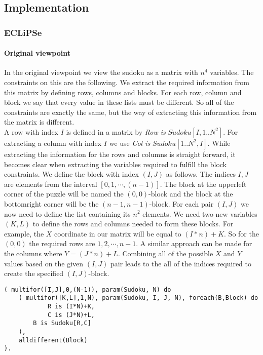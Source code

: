 \subsection{Implementation}
\subsubsection{ECLiPSe}
\paragraph*{Original viewpoint}
In the original viewpoint we view the sudoku as a matrix with $n^{4}$ variables.
The constraints on this are the following.
We extract the required information from this matrix by defining rows, columns and blocks.
For each row, column and block we say that every value in these lists must be different.
So all of the constraints are exactly the same, but the way of extracting this information from the matrix is different.\\

A row with index $I$ is defined in a matrix by \textit{Row is} $Sudoku[I,1..N^{2}]$. 
For extracting a column with index $I$ we use \textit{Col is } $Sudoku[1..N^{2},I]$.
While extracting the information for the rows and columns is straight forward, it becomes clear when extracting the variables required to fulfill the block constraints.
We define the block with index $(I,J)$ as follows. 
The indices $I, J$ are elements from the interval $[0,1,\cdots,(n-1)]$.
The block at the upperleft corner of the puzzle will be named the $(0,0)$-block and the block at the bottomright corner will be the $(n-1,n-1)$-block.
For each pair $(I,J)$ we now need to define the list containing its $n^{2}$ elements.
We need two new variables $(K,L)$ to define the rows and columns needed to form these blocks.
For example, the $X$ coordinate in our matrix will be equal to $(I*n)+K$. 
So for the $(0,0)$ the required rows are $1,2,\cdots,n-1$.
A similar approach can be made for the columns where $Y = (J*n)+L$.
Combining all of the possible $X$ and $Y$ values based on the given $(I,J)$ pair leads to the all of the indices required to create the specified $(I,J)$-block.

\begin{lstlisting}
( multifor([I,J],0,(N-1)), param(Sudoku, N) do
	( multifor([K,L],1,N), param(Sudoku, I, J, N), foreach(B,Block) do
        	R is (I*N)+K,
        	C is (J*N)+L,
		B is Sudoku[R,C]
    ),
	alldifferent(Block)
).
\end{lstlisting}

